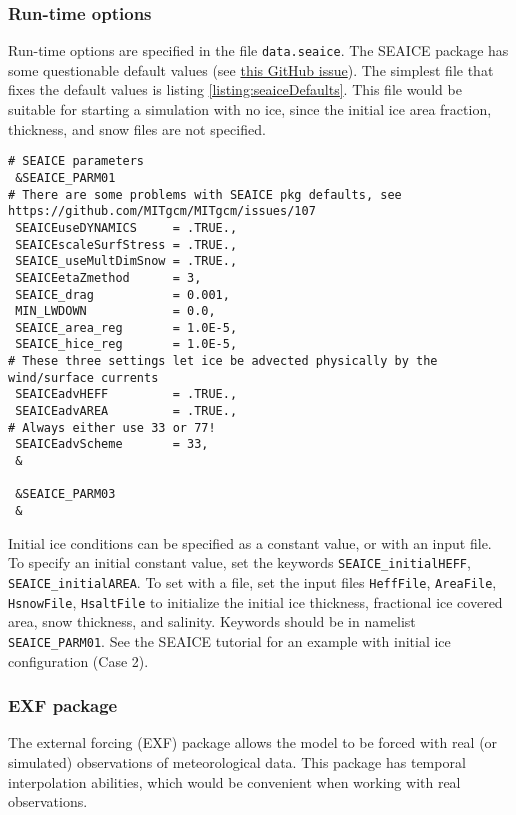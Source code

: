 \documentclass[11pt]{article}
\begin{document}
\subsubsection*{Run-time options}
Run-time options are specified in the file \verb|data.seaice|. The SEAICE package has some questionable default values (see \href{https://github.com/MITgcm/MITgcm/issues/107}{this GitHub issue}). The simplest file that fixes the default values is listing \ref{listing:seaiceDefaults}. This file would be suitable for starting a simulation with no ice, since the initial ice area fraction, thickness, and snow files are not specified.

\begin{lstlisting}[caption={Recommended parameters for data.seaice file}, label={listing:seaiceDefaults}]
# SEAICE parameters
 &SEAICE_PARM01
# There are some problems with SEAICE pkg defaults, see https://github.com/MITgcm/MITgcm/issues/107
 SEAICEuseDYNAMICS     = .TRUE.,
 SEAICEscaleSurfStress = .TRUE.,
 SEAICE_useMultDimSnow = .TRUE.,
 SEAICEetaZmethod      = 3,
 SEAICE_drag           = 0.001,
 MIN_LWDOWN            = 0.0,
 SEAICE_area_reg       = 1.0E-5,
 SEAICE_hice_reg       = 1.0E-5,
# These three settings let ice be advected physically by the wind/surface currents
 SEAICEadvHEFF         = .TRUE.,
 SEAICEadvAREA         = .TRUE.,
# Always either use 33 or 77!
 SEAICEadvScheme       = 33,
 &

 &SEAICE_PARM03
 &
\end{lstlisting}

Initial ice conditions can be specified as a constant value, or with an input file. To specify an initial constant value, set the keywords \verb|SEAICE_initialHEFF|, \verb|SEAICE_initialAREA|. To set with a file, set the input files \verb|HeffFile|, \verb|AreaFile|, \verb|HsnowFile|, \verb|HsaltFile| to initialize the initial ice thickness, fractional ice covered area, snow thickness, and salinity. Keywords should be in namelist \verb|SEAICE_PARM01|. See the SEAICE tutorial for an example with initial ice configuration (Case 2).

\subsubsection{EXF package}
The external forcing (EXF) package allows the model to be forced with real (or simulated) observations of meteorological data. This package has temporal interpolation abilities, which would be convenient when working with real observations.
\end{document}
